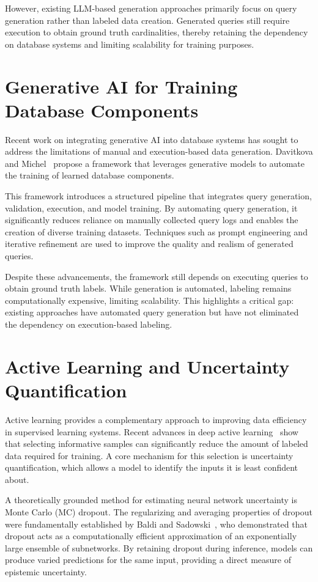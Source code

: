 However, existing LLM-based generation approaches primarily focus on query generation rather than labeled data creation. Generated queries still require execution to obtain ground truth cardinalities, thereby retaining the dependency on database systems and limiting scalability for training purposes.

\section{Generative AI for Training Database Components}

Recent work on integrating generative AI into database systems has sought to address the limitations of manual and execution-based data generation. Davitkova and Michel~\cite{DBLP:journals/corr/abs-2512-20271} propose a framework that leverages generative models to automate the training of learned database components.

This framework introduces a structured pipeline that integrates query generation, validation, execution, and model training. By automating query generation, it significantly reduces reliance on manually collected query logs and enables the creation of diverse training datasets. Techniques such as prompt engineering and iterative refinement are used to improve the quality and realism of generated queries.

Despite these advancements, the framework still depends on executing queries to obtain ground truth labels. While generation is automated, labeling remains computationally expensive, limiting scalability. This highlights a critical gap: existing approaches have automated query generation but have not eliminated the dependency on execution-based labeling.

\section{Active Learning and Uncertainty Quantification}

Active learning provides a complementary approach to improving data efficiency in supervised learning systems. Recent advances in deep active learning~\cite{DBLP:journals/tnn/LiWCJDO25} show that selecting informative samples can significantly reduce the amount of labeled data required for training. A core mechanism for this selection is uncertainty quantification, which allows a model to identify the inputs it is least confident about.

A theoretically grounded method for estimating neural network uncertainty is Monte Carlo (MC) dropout. The regularizing and averaging properties of dropout were fundamentally established by Baldi and Sadowski~\cite{DBLP:journals/ai/BaldiS14}, who demonstrated that dropout acts as a computationally efficient approximation of an exponentially large ensemble of subnetworks. By retaining dropout during inference, models can produce varied predictions for the same input, providing a direct measure of epistemic uncertainty.

